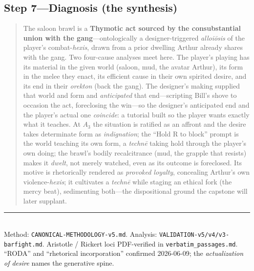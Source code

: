\documentclass[11pt]{article}
\begin{document}
\subsection*{Step 7---Diagnosis (the synthesis)}
\begin{quote}\small
The saloon brawl is a \textbf{Thymotic act sourced by the consubstantial union with the gang}---ontologically a designer-triggered \textit{alloi\=osis} of the player's combat-\textit{hexis}, drawn from a prior dwelling Arthur already shares with the gang. Two four-cause analyses meet here. The player's playing has its material in the given world (saloon, mud, the avatar Arthur), its form in the melee they enact, its efficient cause in their own spirited desire, and its end in their \textit{orekton} (back the gang). The designer's making supplied that world and form and \emph{anticipated} that end---scripting Bill's shove to occasion the act, foreclosing the win---so the designer's anticipated end and the player's actual one \emph{coincide}: a tutorial built so the player wants exactly what it teaches. At $A_3$ the situation is ratified as an affront and the desire takes determinate form as \emph{indignation}; the ``Hold R to block'' prompt is the world teaching its own form, a \textit{techn\=e} taking hold through the player's own doing; the brawl's bodily recalcitrance (mud, the grapple that resists) makes it \emph{dwelt}, not merely watched, even as its outcome is foreclosed. Its motive is rhetorically rendered as \emph{provoked loyalty}, concealing Arthur's own violence-\textit{hexis}; it cultivates a \textit{techn\=e} while staging an ethical fork (the mercy beat), sedimenting both---the dispositional ground the capstone will later supplant.
\end{quote}

\vspace{4pt}
\noindent\rule{\linewidth}{0.4pt}\\[2pt]
\footnotesize Method: \texttt{CANONICAL-METHODOLOGY-v5.md}. Analysis: \texttt{VALIDATION-v5/v4/v3-barfight.md}. Aristotle / Rickert loci PDF-verified in \texttt{verbatim\_passages.md}. ``RODA'' and ``rhetorical incorporation'' confirmed 2026-06-09; the \emph{actualization of desire} names the generative spine.
\end{document}
